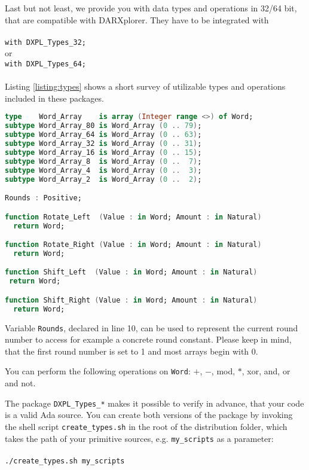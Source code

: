 \documentclass{acmtrans2m}
\begin{document}
Last but not least, we provide you with data types and operations in 32/64 bit, that are
compatible with DARXplorer. They have to be integrated with\\ \\
\noindent\hspace*{12mm}%
\texttt{with DXPL\_Types\_32;}\\
or\\
\noindent\hspace*{12mm}%
\texttt{with DXPL\_Types\_64;}\\ \\

Listing \ref{listing:types} shows a short survey of utilizable types and operations
included in these packages.

\vfill

\begin{lstlisting}[label=listing:types,language=Ada,caption=DXPL\_Types\_32.ads]
type    Word_Array    is array (Integer range <>) of Word;
subtype Word_Array_80 is Word_Array (0 .. 79);
subtype Word_Array_64 is Word_Array (0 .. 63);
subtype Word_Array_32 is Word_Array (0 .. 31);
subtype Word_Array_16 is Word_Array (0 .. 15);
subtype Word_Array_8  is Word_Array (0 ..  7);
subtype Word_Array_4  is Word_Array (0 ..  3);
subtype Word_Array_2  is Word_Array (0 ..  2);

Rounds : Positive;

function Rotate_Left  (Value : in Word; Amount : in Natural)
  return Word;

function Rotate_Right (Value : in Word; Amount : in Natural)
  return Word;

function Shift_Left  (Value : in Word; Amount : in Natural)
 return Word;

function Shift_Right (Value : in Word; Amount : in Natural)
  return Word;
\end{lstlisting}

Variable \texttt{Rounds}, declared in line 10, can be used to represent
the current round number to access for example a concrete round constant.
Please keep in mind, that the first round number is set to 1 and most 
arrays begin with 0.

You can perform the following operations on \texttt{Word}: $+$, $-$, mod, $*$,
xor, and, or and not.
 
\bigbreak
 
The package \texttt{DXPL\_Types\_*} makes it possible to verify in advance,
that your code is a valid Ada source. You can create both versions of the package
by invoking the shell script \texttt{create\_types.sh} in the root of the distribution 
folder, which takes the path of your primitive sources, e.g. \texttt{my\_scripts}
as a parameter:\\ \\
\noindent\hspace*{12mm}%
\texttt{./create\_types.sh my\_scripts}\\
\end{document}
